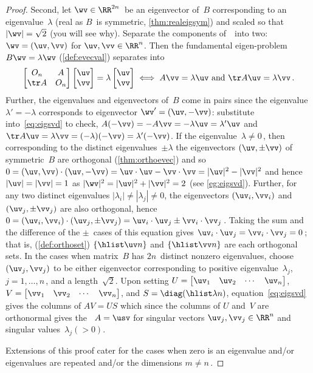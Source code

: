 \begin{proof}
Second, let \(\wv\in\RR^{2n}\)\ be an eigenvector of~\(B\) corresponding to an eigenvalue~\(\lambda\) (real as \(B\)~is symmetric, \cref{thm:realeigsym}) and scaled so that \(|\wv|=\sqrt2\) (you will see why).
Separate the components of~\wv\ into two: \(\wv=(\uv,\vv)\) for \(\uv,\vv\in\RR^n\).
Then the fundamental eigen-problem \(B\wv=\lambda\wv\)  (\cref{def:evecval}) separates into
\begin{equation}
\begin{bmatrix} O_n& A\\\tr A&O_n \end{bmatrix}\begin{bmatrix} \uv\\\vv \end{bmatrix}=\lambda\begin{bmatrix} \uv\\\vv \end{bmatrix}
\iff  A\vv=\lambda\uv \text{ and }\tr A\uv=\lambda\vv\,.
\label{eq:eigsvd}
\end{equation}
Further, the eigenvalues and eigenvectors of~\(B\) come in pairs since the eigenvalue \(\lambda'=-\lambda\) corresponds to eigenvector \(\wv'=(\uv,-\vv)\): substitute into~\eqref{eq:eigsvd} to check, \(A(-\vv)=-A\vv=-\lambda\uv=\lambda'\uv\) and \(\tr A\uv=\lambda\vv=(-\lambda)(-\vv)=\lambda'(-\vv)\).
If the eigenvalue~\(\lambda\neq0\)\,, then corresponding to the distinct eigenvalues~\(\pm\lambda\) the eigenvectors \((\uv,\pm\vv)\) of symmetric~\(B\) are orthogonal (\cref{thm:orthoevec}) and so \(0=(\uv,\vv)\cdot(\uv,-\vv)=\uv\cdot\uv-\vv\cdot\vv=|\uv|^2-|\vv|^2\) and hence \(|\uv|=|\vv|=1\) as \(|\wv|^2=|\uv|^2+|\vv|^2=2\) (see \cref{eg:eigsvd}).
Further, for any two distinct eigenvalues \(|\lambda_i|\neq|\lambda_j|\neq 0\), the eigenvectors \((\uv_i,\vv_i)\) and \((\uv_j,\pm\vv_j)\) are also orthogonal, hence \(0 =(\uv_i,\vv_i)\cdot(\uv_j,\pm\vv_j) =\uv_i\cdot\uv_j \pm\vv_i\cdot\vv_j\)\,.
Taking the sum and the difference of the \(\pm\)~cases of this equation gives \(\uv_i\cdot\uv_j=\vv_i\cdot\vv_j=0\)\,; that is,  (\cref{def:orthoset}) \(\{\hlist\uv n\}\) and \(\{\hlist\vv n\}\) are each orthogonal sets.
In the cases when matrix~\(B\) has \(2n\)~distinct nonzero eigenvalues, choose \((\uv_j,\vv_j)\) to be either eigenvector corresponding to positive eigenvalue~\(\lambda_j\), \(j=1,\ldots,n\)\,, and a length~\(\sqrt2\). 
Upon setting \(U=\begin{bmatrix} \uv_1&\uv_2&\cdots&\uv_n \end{bmatrix}\), \(V=\begin{bmatrix} \vv_1&\vv_2&\cdots&\vv_n \end{bmatrix}\), and \(S=\diag(\hlist\lambda n)\), equation~\eqref{eq:eigsvd} gives the columns of \(AV=US\) which since the columns of \(U\) and~\(V\) are orthonormal gives the \svd\ \(A=\usv\) for singular vectors \(\uv_j,\vv_j\in\RR^n\) and singular values~\(\lambda_j(>0)\).

Extensions of this proof cater for the cases when zero is an eigenvalue and/or eigenvalues are repeated and/or the dimensions \(m\neq n\)\,.
\end{proof}


